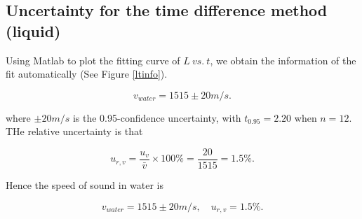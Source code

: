 \subsection{Uncertainty for the time difference method (liquid)}

Using Matlab to plot the fitting curve of $L\ vs.\ t$, we obtain the
information of the fit automatically (See Figure \ref{ltinfo}).  

\[
    v_{water}=1515\pm20 m/s. 
\]

where $\pm 20m/s$ is the 0.95-confidence uncertainty, with $t_{0.95}=2.20$
when $n=12$. THe relative uncertainty is that 

\[
    u_{r,v}=\frac{u_v}{\bar{v}}\times100\%=\frac{20}{1515}=1.5\%. 
\]

Hence the speed of sound in water is 

\[
    v_{water}=1515\pm20m/s,\quad u_{r,v}=1.5\%. 
\]